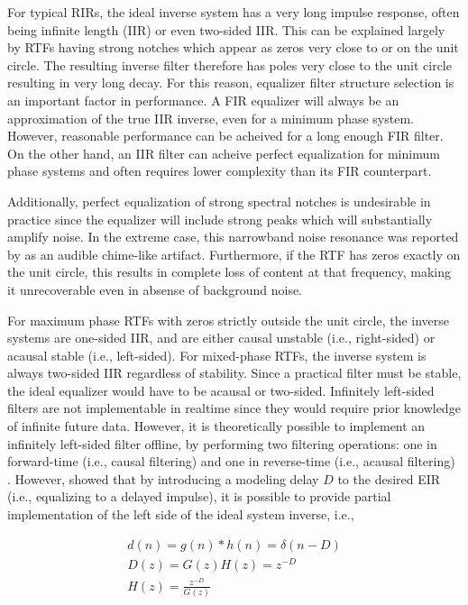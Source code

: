For typical RIRs, the ideal inverse system has a very long impulse response, often being infinite length (IIR) or even two-sided IIR. This can be explained largely by RTFs having strong notches which appear as zeros very close to or on the unit circle. The resulting inverse filter therefore has poles very close to the unit circle resulting in very long decay. For this reason, equalizer filter structure selection is an important factor in performance. A FIR equalizer will always be an approximation of the true IIR inverse, even for a minimum phase system. However, reasonable performance can be acheived for a long enough FIR filter. On the other hand, an IIR filter can acheive perfect equalization for minimum phase systems and often requires lower complexity than its FIR counterpart.

Additionally, perfect equalization of strong spectral notches is undesirable in practice since the equalizer will include strong peaks which will substantially amplify noise. In the extreme case, this narrowband noise resonance was reported by \cite{neely1979invertibility} as an audible chime-like artifact. Furthermore, if the RTF has zeros exactly on the unit circle, this results in complete loss of content at that frequency, making it unrecoverable even in absense of background noise.

 For maximum phase RTFs with zeros strictly outside the unit circle, the inverse systems are one-sided IIR, and are either causal unstable (i.e., right-sided) or acausal stable (i.e., left-sided). For mixed-phase RTFs, the inverse system is always two-sided IIR regardless of stability. Since a practical filter must be stable, the ideal equalizer would have to be acausal or two-sided. Infinitely left-sided filters are not implementable in realtime since they would require prior knowledge of infinite future data. However, it is theoretically possible to implement an infinitely left-sided filter offline, by performing two filtering operations: one in forward-time (i.e., causal filtering) and one in reverse-time (i.e., acausal filtering) \citep{kormylo1974twopass}. However, \cite{treitel1966design} showed that by introducing a modeling delay $D$ to the desired EIR (i.e., equalizing to a delayed impulse), it is possible to provide partial implementation of the left side of the ideal system inverse, i.e., 

\noindent
\begin{eqnarray}
	d(n)=g(n)*h(n)=\delta(n-D) \\
	D(z)=G(z)H(z)=z^{-D}	\\
	H(z)=\frac{z^{-D}}{G(z)}
\end{eqnarray}

